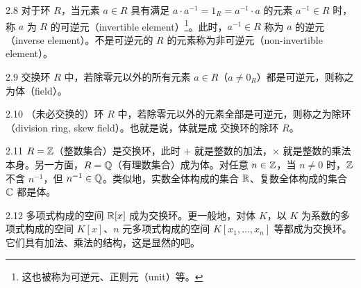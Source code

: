 
\begin{definition}{2.8} 对于环 $R$，当元素 $a\in R$ 具有满足 $a\cdot a^{-1}=1_R=a^{-1}\cdot a$ 的元素 $a^{-1}\in R$ 时，称 $a$ 为 $R$ 的可逆元（invertible element）\footnote{这也被称为可逆元、正则元（unit）等。}。此时，$a^{-1}\in R$ 称为 $a$ 的逆元（inverse element）。不是可逆元的 $R$ 的元素称为非可逆元（non-invertible element）。\end{definition}

\begin{definition}{2.9} 交换环 $R$ 中，若除零元以外的所有元素 $a\in R$（$a\neq0_R$）都是可逆元，则称之为体（field）。\end{definition}

\begin{remark}{2.10} （未必交换的）环 $R$ 中，若除零元以外的元素全部是可逆元，则称之为除环（division ring, skew field）。也就是说，体就是成
交换环的除环 $R$。\end{remark}



\begin{example}{2.11} $R=\mathbb{Z}$（整数集合）是交换环，此时 $+$ 就是整数的加法，$\times$ 就是整数的乘法本身。另一方面，$R=\mathbb{Q}$（有理数集合）成为体。对任意 $n\in\mathbb{Z}$，当 $n\neq0$ 时，$\mathbb{Z}$ 不含 $n^{-1}$，但 $n^{-1}\in\mathbb{Q}$。类似地，实数全体构成的集合 $\mathbb{R}$、复数全体构成的集合 $\mathbb{C}$ 都是体。\end{example}

\begin{example}{2.12} 多项式构成的空间 $\mathbb{R}[x]$ 成为交换环。更一般地，对体 $K$，以 $K$ 为系数的多项式构成的空间 $K[x]$、$n$ 元多项式构成的空间 $K[x_1,\ldots,x_n]$ 等都成为交换环。它们具有加法、乘法的结构，这是显然的吧。\end{example}

